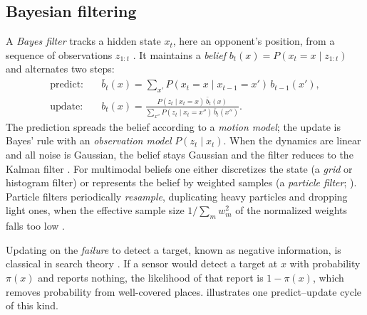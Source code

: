 \documentclass[11pt]{article}
\newcommand{\1}{\mathbb{1}}
\begin{document}
\subsection{Bayesian filtering}
A \emph{Bayes filter} tracks a hidden state $x_t$, here an opponent's position, from a sequence of observations $z_{1:t}$ \citep{thrun2005probabilistic}. It maintains a \emph{belief} $b_t(x) = P(x_t = x \mid z_{1:t})$ and alternates two steps:
\begin{align}
  \text{predict:}\quad & \bar b_t(x) = \sum_{x'} P(x_t = x \mid x_{t-1} = x')\, b_{t-1}(x'), \label{eq:predict}\\
  \text{update:}\quad & b_t(x) = \frac{P(z_t \mid x_t = x)\, \bar b_t(x)}{\sum_{x''} P(z_t \mid x_t = x'')\, \bar b_t(x'')}. \label{eq:update}
\end{align}
The prediction spreads the belief according to a \emph{motion model}; the update is Bayes' rule with an \emph{observation model} $P(z_t \mid x_t)$. When the dynamics are linear and all noise is Gaussian, the belief stays Gaussian and the filter reduces to the Kalman filter \citep{kalman1960new}. For multimodal beliefs one either discretizes the state (a \emph{grid} or histogram filter) or represents the belief by weighted samples (a \emph{particle filter}; \citealp{gordon1993novel,kitagawa1996monte,doucet2001sequential}). Particle filters periodically \emph{resample}, duplicating heavy particles and dropping light ones, when the effective sample size $1/\sum_m w_m^2$ of the normalized weights falls too low \citep{kong1994sequential}.

Updating on the \emph{failure} to detect a target, known as negative information, is classical in search theory \citep{stone1975theory}. If a sensor would detect a target at $x$ with probability $\pi(x)$ and reports nothing, the likelihood of that report is $1 - \pi(x)$, which removes probability from well-covered places.  illustrates one predict--update cycle of this kind.
\end{document}
